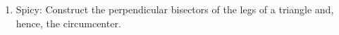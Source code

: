 \documentclass[12pt, oneside]{article}
\begin{document}
\begin{enumerate}
\newpage
  \item Spicy: Construct the perpendicular bisectors of the legs of a triangle and, hence, the circumcenter.\\
    \vspace{3cm}
    \begin{center}
    \end{center}

\end{enumerate}
\end{document}
